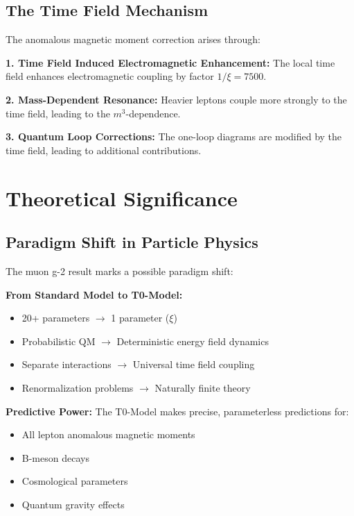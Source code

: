 \documentclass[12pt,a4paper]{report}
\newcommand{\xipar}{\xi}      %
\begin{document}
	\subsection{The Time Field Mechanism}\label{subsec:timefield_mechanism}
	
	The anomalous magnetic moment correction arises through:
	
	\textbf{1. Time Field Induced Electromagnetic Enhancement:}
	The local time field enhances electromagnetic coupling by factor $1/\xipar = 7500$.
	
	\textbf{2. Mass-Dependent Resonance:}
	Heavier leptons couple more strongly to the time field, leading to the $m^3$-dependence.
	
	\textbf{3. Quantum Loop Corrections:}
	The one-loop diagrams are modified by the time field, leading to additional contributions.
	
	\section{Theoretical Significance}\label{sec:theoretical_significance}
	
	\subsection{Paradigm Shift in Particle Physics}\label{subsec:paradigm_shift}
	
	The muon g-2 result marks a possible paradigm shift:
	
	\textbf{From Standard Model to T0-Model:}
	\begin{itemize}
		\item 20+ parameters $\rightarrow$ 1 parameter ($\xipar$)
		\item Probabilistic QM $\rightarrow$ Deterministic energy field dynamics
		\item Separate interactions $\rightarrow$ Universal time field coupling
		\item Renormalization problems $\rightarrow$ Naturally finite theory
	\end{itemize}
	
	\textbf{Predictive Power:}
	The T0-Model makes precise, parameterless predictions for:
	\begin{itemize}
		\item All lepton anomalous magnetic moments
		\item B-meson decays
		\item Cosmological parameters
		\item Quantum gravity effects
	\end{itemize}
	
\end{document}
